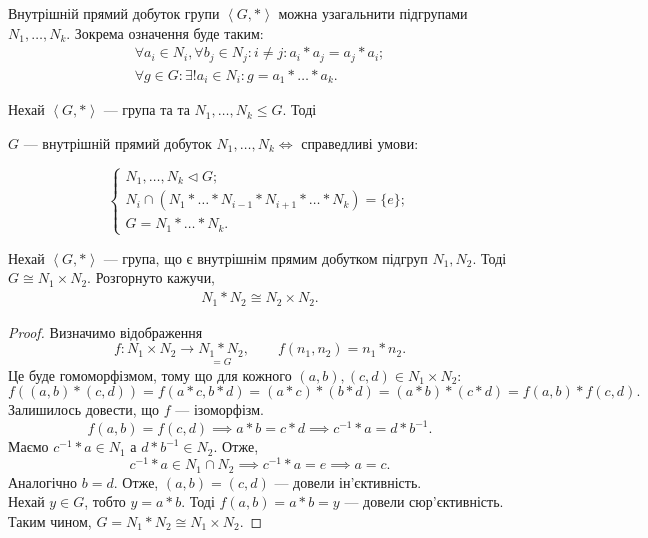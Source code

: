 \documentclass{math_library}
\begin{document}
\begin{remark}
Внутрішній прямий добуток групи $\left< G, *\right>$ можна узагальнити підгрупами $N_1,\dots,N_k$. Зокрема означення буде таким:
\begin{align*}
\forall a_i \in N_i, \forall b_j \in N_j: i \neq j: a_i*a_j = a_j*a_i; \\
\forall g \in G: \exists !a_i \in N_i: g = a_1 * \dots * a_k.
\end{align*}
\end{remark}

\begin{theorem}
Нехай $\left<G, *\right>$ --- група та та $N_1,\dots,N_k \leq G$. Тоді
\begin{center}
$G$ --- внутрішній прямий добуток $N_1,\dots,N_k \iff$ справедливі умови:
\end{center}
\begin{equation*}
\label{internal_product_bigger_than_2}
\begin{cases} N_1, \dots, N_k \triangleleft G; \\ N_i \cap (N_1*\dots*N_{i-1}*N_{i+1}*\dots*N_k) = \{e\}; \\ G = N_1*\dots*N_k. \end{cases}
\end{equation*}
\end{theorem}

\begin{theorem}
Нехай $\left< G, *\right>$ --- група, що є внутрішнім прямим добутком підгруп $N_1,N_2$. Тоді $G \cong N_1 \times N_2$. Розгорнуто кажучи, 
\begin{align*}
N_1 * N_2 \cong N_2 \times N_2.
\end{align*}
\end{theorem}

\begin{proof}
Визначимо відображення 
\[
f \colon N_1 \times N_2 \to \underset{=G}{N_1*N_2}, \qquad f(n_1,n_2) = n_1*n_2.
\]
Це буде гомоморфізмом, тому що для кожного $(a,b),(c,d) \in N_1 \times N_2:$
\[
f((a,b)*(c,d)) = f(a*c,b*d) = (a*c)*(b*d) = (a*b)*(c*d) = f(a,b)*f(c,d).
\]
Залишилось довести, що $f$ --- ізоморфізм.
\[
f(a,b)=f(c,d) \implies a*b = c*d \implies c^{-1}*a = d*b^{-1}.
\]
Маємо $c^{-1}*a \in N_1$ а $d*b^{-1} \in N_2$. Отже, 
\[
c^{-1}*a \in N_1 \cap N_2 \implies c^{-1}*a=e \implies a = c.
\] 
Аналогічно $b = d$. Отже, $(a,b) = (c,d)$ --- довели ін'єктивність.\\
Нехай $y \in G$, тобто $y = a*b$. Тоді $f(a,b) = a*b = y$ --- довели сюр'єктивність.\\
Таким чином, $G = N_1 * N_2 \cong N_1 \times N_2$.
\end{proof}
\end{document}
